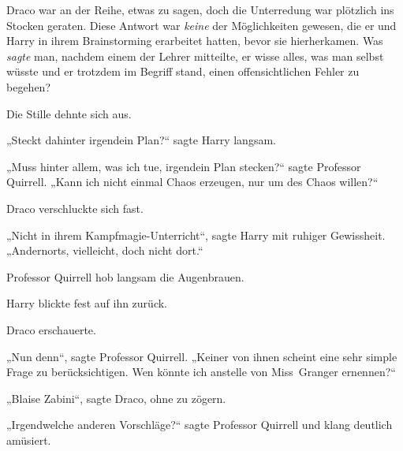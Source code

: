 Draco war an der Reihe, etwas zu sagen, doch die Unterredung war plötzlich ins Stocken geraten. Diese Antwort war \emph{keine} der Möglichkeiten gewesen, die er und Harry in ihrem Brainstorming erarbeitet hatten, bevor sie hierherkamen. Was \emph{sagte} man, nachdem einem der Lehrer mitteilte, er wisse alles, was man selbst wüsste und er trotzdem im Begriff stand, einen offensichtlichen Fehler zu begehen?

Die Stille dehnte sich aus.

„Steckt dahinter irgendein Plan?“ sagte Harry langsam.

„Muss hinter allem, was ich tue, irgendein Plan stecken?“ sagte Professor Quirrell.
„Kann ich nicht einmal Chaos erzeugen, nur um des Chaos willen?“

Draco verschluckte sich fast.

„Nicht in ihrem Kampfmagie-Unterricht“, sagte Harry mit ruhiger Gewissheit.
„Andernorts, vielleicht, doch nicht dort.“

Professor Quirrell hob langsam die Augenbrauen.

Harry blickte fest auf ihn zurück.

Draco erschauerte.

„Nun denn“, sagte Professor Quirrell.
„Keiner von ihnen scheint eine sehr simple Frage zu berücksichtigen. Wen könnte ich anstelle von Miss~Granger ernennen?“

„Blaise Zabini“, sagte Draco, ohne zu zögern.

„Irgendwelche anderen Vorschläge?“ sagte Professor Quirrell und klang deutlich amüsiert.

